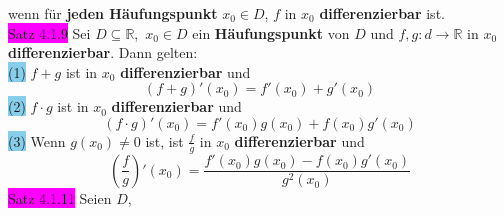 \documentclass[landscape, 10pt]{article}
\newcommand{\R}{\mathbb{R}}
\begin{document}
\begin{multicols}{3}
                     wenn für \textbf{jeden Häufungspunkt} 
                     \textcolor{NavyBlue}{$x_0\in D$},
                     \textcolor{NavyBlue}{$f$} in 
                     \textcolor{NavyBlue}{$x_0$} 
                     \textbf{differenzierbar} ist.\\
              \colorbox{magenta}{Satz 4.1.9} 
                     Sei \textcolor{NavyBlue}{$D\subseteq\R$},\,
                     \textcolor{NavyBlue}{$x_0\in D$} 
                     ein \textbf{Häufungspunkt} von 
                     \textcolor{NavyBlue}{$D$} 
                     und \textcolor{NavyBlue}{
                     $f,g:d\longrightarrow\R$} in 
                     \textcolor{NavyBlue}{$x_0$} 
                     \textbf{differenzierbar}. 
                     Dann gelten:\\
                     \colorbox{SkyBlue}{(1)} 
                            \textcolor{NavyBlue}{$f+g$}
                            ist in \textcolor{NavyBlue}{$x_0$} 
                            \textbf{differenzierbar} und 
                            \begin{equation*}
                                   (f+g)'(x_0)=f'(x_0)+g'(x_0)
                            \end{equation*}
                     \colorbox{SkyBlue}{(2)} 
                            \textcolor{NavyBlue}{$f\cdot g$} 
                            ist in \textcolor{NavyBlue}{$x_0$} 
                            \textbf{differenzierbar} und 
                            \begin{equation*}
                                   (f\cdot g)'(x_0)
                                   =f'(x_0)g(x_0)+f(x_0)g'(x_0)
                            \end{equation*}
                     \colorbox{SkyBlue}{(3)} Wenn 
                            \textcolor{NavyBlue}{
                            $g(x_0)\neq0$} ist, ist 
                            \textcolor{NavyBlue}{
                            $\frac{f}{g}$} in 
                            \textcolor{NavyBlue}{$x_0$} 
                            \textbf{differenzierbar} und 
                            \begin{equation*}
                                   (\frac{f}{g})'(x_0)
                                   =\frac{f'(x_0)g(x_0)
                                   -f(x_0)g'(x_0)}{g^2(x_0)}
                            \end{equation*}
              \colorbox{magenta}{Satz 4.1.11}
                     Seien \textcolor{NavyBlue}{$D$},

\end{multicols}
\end{document}
